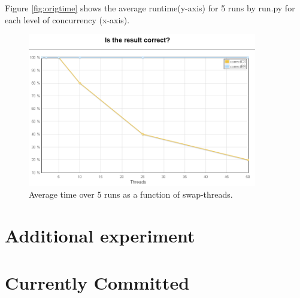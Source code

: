 Figure \ref{fig:origtime} shows the average runtime(y-axis) for 5 runs by run.py for
each level of concurrency (x-axis).


\begin{figure}
  \centering
  \includegraphics[width=10cm]{origcorrect}
  \caption{Average time over 5 runs as a function of swap-threads.}\label{fig:origcorrect}
\end{figure}

\section{Additional experiment}



\section{Currently Committed}



